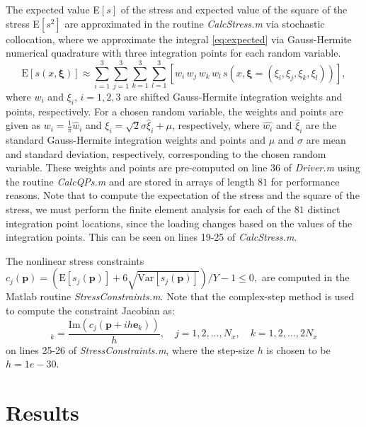 \documentclass[10pt]{article}
\newcommand{\bs}[1] {\boldsymbol{#1}}
\begin{document}
The expected value E$[s]$ of the stress
and expected value of the square of the stress E$[s^2]$
are approximated in the routine \emph{CalcStress.m} via
stochastic collocation, where we approximate the integral
\eqref{eq:expected} via Gauss-Hermite numerical quadrature
with three integration points for each random variable.
%
\begin{equation}
\text{E}[s(x, \bs{\xi})] \approx
\sum_{i=1}^3 \sum_{j=1}^3 \sum_{k=1}^3 \sum_{l=1}^3
\left[
w_i \, w_j \, w_k \, w_l  \,
s(x, \bs{\xi} = (\xi_i, \xi_j, \xi_k, \xi_l))
\right],
\end{equation}
%
where $w_i$ and $\xi_i$, $i=1,2,3$ are shifted
Gauss-Hermite integration weights and points, respectively.
For a chosen random variable, the weights and points are given as
$w_i = \frac{1}{\pi} \hat{w}_i$ and
$\xi_i = \sqrt{2} \sigma \hat{\xi}_i + \mu$, respectively,
where $\hat{w_i}$ and $\hat{\xi}_i$ are the standard
Gauss-Hermite integration weights and points and
$\mu$ and $\sigma$ are mean and standard deviation, respectively,
corresponding to the chosen random variable.
These weights and points are pre-computed on line 36 of \emph{Driver.m}
using the routine \emph{CalcQPs.m} and are stored in arrays of
length $81$ for performance reasons.
Note that to compute the expectation of the stress and the
square of the stress, we must perform the finite element
analysis for each of the $81$ distinct integration point locations,
since
the loading changes based on the values of the integration
points. This can be seen on lines 19-25 of \emph{CalcStress.m}.

The nonlinear stress constraints
$c_j(\bs{p}) = \left(\text{E}[s_j(\bs{p})] +
6 \sqrt{\text{Var}[s_j(\bs{p})] } \right) / Y 
- 1 \leq 0,$
are computed in the Matlab routine \emph{StressConstraints.m}.
Note that the complex-step method is used to compute the constraint
Jacobian as: 
%
\begin{equation}
[ \nabla c_j(\bs{p}) ]_k = \frac{\text{Im}(c_j( \bs{p} + i h \bs{e}_k))}{h},
\quad j=1,2,\dots,N_x,
\quad k=1,2,\dots,2N_x
\end{equation}
%
on lines 25-26 of \emph{StressConstraints.m},
where the step-size $h$ is chosen to be
$h = 1e-30$.

\section{Results}
\end{document}
